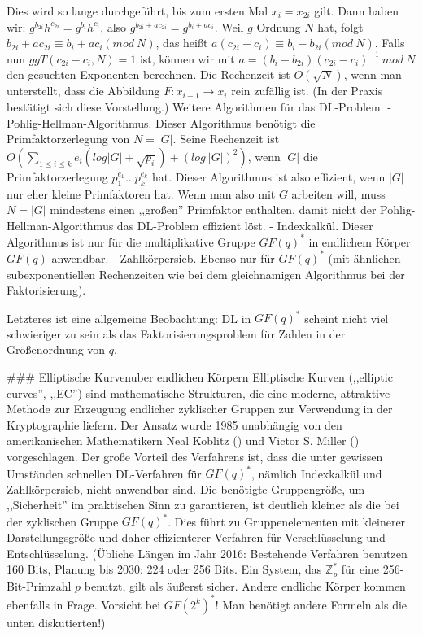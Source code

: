 \documentclass[a4paper]{article}
\begin{document}
\begin{multicols}{3}
{{{{            Dies wird so lange durchgeführt, bis zum ersten Mal $x_i=x_{2i}$ gilt. Dann haben wir: $g^{b_{2i}} h^{c_{2i}}=g^{b_i} h^{c_i}$, also $g^{b_{2i}+ac_{2i}}=g^{b_i+ac_i}$. Weil $g$ Ordnung $N$ hat, folgt $b_{2i} +ac_{2i}\equiv b_i+ac_i (mod\ N)$, das heißt $a(c_{2i}-c_i)\equiv b_i-b_{2i} (mod\ N)$.
            Falls nun $ggT(c_{2i}-c_i,N) = 1$ ist, können wir mit $a= (b_i-b_{2i})(c_{2i}-c_i)^{-1}\ mod\ N$ den gesuchten Exponenten berechnen.
            Die Rechenzeit ist $O(\sqrt{N})$, wenn man unterstellt, dass die Abbildung $F:x_{i-1}\rightarrow x_i$ rein zufällig ist. (In der Praxis bestätigt sich diese Vorstellung.)
            Weitere Algorithmen für das DL-Problem:
            - Pohlig-Hellman-Algorithmus. Dieser Algorithmus benötigt die Primfaktorzerlegung von $N=|G|$. Seine Rechenzeit ist $O(\sum_{1 \leq i\leq k} e_i(log|G|+\sqrt{p_i}) + (log\ |G|)^2)$, wenn $|G|$ die Primfaktorzerlegung $p^{e_1}_1... p^{e_k}_k$ hat. Dieser Algorithmus ist also effizient, wenn $|G|$ nur eher kleine Primfaktoren hat. Wenn man also mit $G$ arbeiten will, muss $N=|G|$ mindestens einen ,,großen'' Primfaktor enthalten, damit nicht der Pohlig-Hellman-Algorithmus das DL-Problem effizient löst.
            - Indexkalkül. Dieser Algorithmus ist nur für die multiplikative Gruppe $GF(q)^*$ in endlichem Körper $GF(q)$ anwendbar.
            - Zahlkörpersieb. Ebenso nur für $GF(q)^*$ (mit ähnlichen subexponentiellen Rechenzeiten wie bei dem gleichnamigen Algorithmus bei der Faktorisierung).

            Letzteres ist eine allgemeine Beobachtung: DL in $GF(q)^*$ scheint nicht viel schwieriger zu sein als das Faktorisierungsproblem für Zahlen in der Größenordnung von $q$.

            ### Elliptische Kurvenuber endlichen Körpern
            Elliptische Kurven (,,elliptic curves'', ,,EC'') sind mathematische Strukturen, die eine moderne, attraktive Methode zur Erzeugung endlicher zyklischer Gruppen zur Verwendung in der Kryptographie liefern. Der Ansatz wurde 1985 unabhängig von den amerikanischen Mathematikern Neal Koblitz () und Victor S. Miller () vorgeschlagen. Der große Vorteil des Verfahrens ist, dass die unter gewissen Umständen schnellen DL-Verfahren für $GF(q)^*$, nämlich Indexkalkül und Zahlkörpersieb, nicht anwendbar sind. Die benötigte Gruppengröße, um ,,Sicherheit'' im praktischen Sinn zu garantieren, ist deutlich kleiner als die bei der zyklischen Gruppe $GF(q)^*$. Dies führt zu Gruppenelementen mit kleinerer Darstellungsgröße und daher effizienterer Verfahren für Verschlüsselung und Entschlüsselung.
            (Übliche Längen im Jahr 2016: Bestehende Verfahren benutzen 160 Bits, Planung bis 2030: 224 oder 256 Bits. Ein System, das $\mathbb{Z}^*_p$ für eine 256-Bit-Primzahl $p$ benutzt, gilt als äußerst sicher. Andere endliche Körper kommen ebenfalls in Frage. Vorsicht bei $GF(2^k)^*$! Man benötigt andere Formeln als die unten diskutierten!)

}}}}
\end{multicols}
\end{document}
